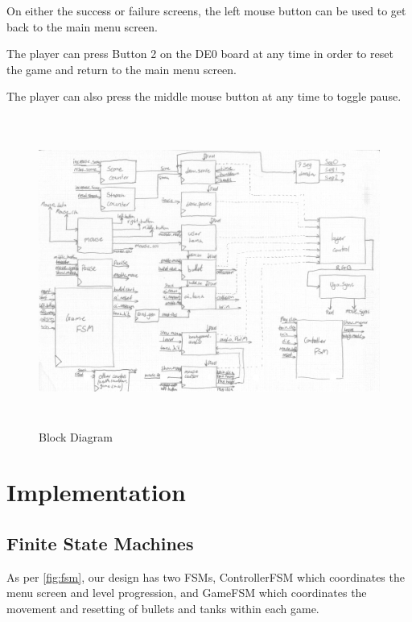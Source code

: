 \documentclass{article}
\begin{document}
On either the success or failure screens, the left mouse button can be used to get back to the main menu screen.

The player can press Button 2 on the DE0 board at any time in order to reset the game and return to the main menu screen.

The player can also press the middle mouse button at any time to toggle pause.

\begin{figure}[!b]
\centerline{\includegraphics[height=4in]{blockDiagram}}
\caption{Block Diagram}
\label{fig:blockd}
\end{figure}

\section{Implementation}

\subsection{Finite State Machines}

As per \ref{fig:fsm}, our design has two FSMs, ControllerFSM which coordinates the menu screen and level progression, and GameFSM which coordinates the movement and resetting of bullets and tanks within each game.
\end{document}
